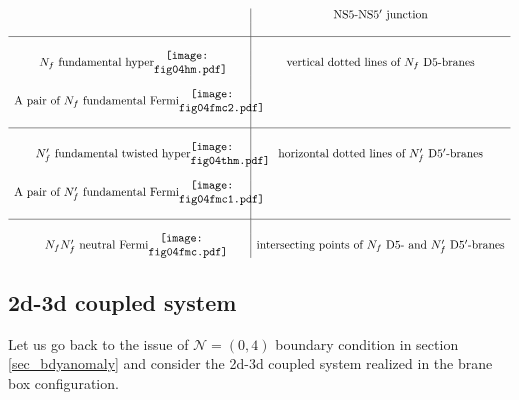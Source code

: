 \documentclass{article}
\numberwithin{equation}{section}
\begin{document}
\begin{align}
\begin{array}{c|c}
\begin{minipage}{2truecm}
\end{minipage}
& \textrm{NS5-NS5$'$ junction}\\ 
& \\
\hline
 & \\
\textrm{$N_{f}$ fundamental hyper}
\begin{minipage}{2truecm}
\centering
\texttt{[image: fig04hm.pdf]}
\end{minipage}
& \textrm{vertical dotted lines of $N_{f}$ D5-branes}\\
& \\
\textrm{A pair of $N_{f}$ fundamental Fermi}
\begin{minipage}{2truecm}
\centering
\texttt{[image: fig04fmc2.pdf]}
\end{minipage} \\
& \\ \hline
& \\ 
\textrm{$N_{f}'$ fundamental twisted hyper}
\begin{minipage}{1truecm}
\centering
\texttt{[image: fig04thm.pdf]}
\end{minipage}
& \textrm{horizontal dotted lines of $N_{f}'$ D5$'$-branes}\\
& \\
\textrm{A pair of $N_{f}'$ fundamental Fermi}
\begin{minipage}{2truecm}
\centering
\texttt{[image: fig04fmc1.pdf]}
\end{minipage}
& \\
& \\ \hline 
& \\
\textrm{$N_{f}N_{f}'$ neutral Fermi}
\begin{minipage}{2truecm}
\centering
\texttt{[image: fig04fmc.pdf]}
\end{minipage}
&\textrm{intersecting points of $N_{f}$ D5- and $N_{f}'$ D5$'$-branes} \\
\end{array}
\end{align}


\subsection{2d-3d coupled system}
\label{sec_2d3d}
Let us go back to the issue of $\mathcal{N}=(0,4)$ boundary condition in section \ref{sec_bdyanomaly}  
and consider the 2d-3d coupled system realized in the brane box configuration. 
\end{document}
